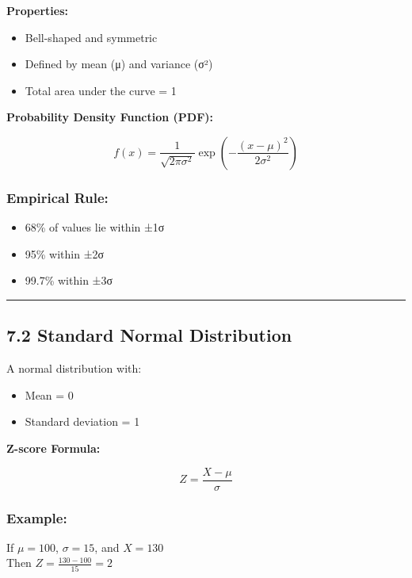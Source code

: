 \documentclass[
  letterpaper,
  DIV=11,
  numbers=noendperiod]{scrreprt}
\providecommand{\tightlist}{%
  \setlength{\itemsep}{0pt}\setlength{\parskip}{0pt}}
\begin{document}
\textbf{Properties:}

\begin{itemize}
\tightlist
\item
  Bell-shaped and symmetric
\item
  Defined by mean (μ) and variance (σ²)
\item
  Total area under the curve = 1
\end{itemize}

\textbf{Probability Density Function (PDF):}

\[
f(x) = \frac{1}{\sqrt{2\pi \sigma^2}} \exp \left( -\frac{(x - \mu)^2}{2\sigma^2} \right)
\]

\subsubsection{Empirical Rule:}\label{empirical-rule}

\begin{itemize}
\tightlist
\item
  68\% of values lie within ±1σ
\item
  95\% within ±2σ
\item
  99.7\% within ±3σ
\end{itemize}

\begin{center}\rule{0.5\linewidth}{0.5pt}\end{center}

\subsection{7.2 Standard Normal
Distribution}\label{standard-normal-distribution}

A normal distribution with:

\begin{itemize}
\tightlist
\item
  Mean = 0
\item
  Standard deviation = 1
\end{itemize}

\textbf{Z-score Formula:}

\[
Z = \frac{X - \mu}{\sigma}
\]

\subsubsection{Example:}\label{example-8}

If \(\mu = 100\), \(\sigma = 15\), and \(X = 130\)\\
Then \(Z = \frac{130 - 100}{15} = 2\)
\end{document}
